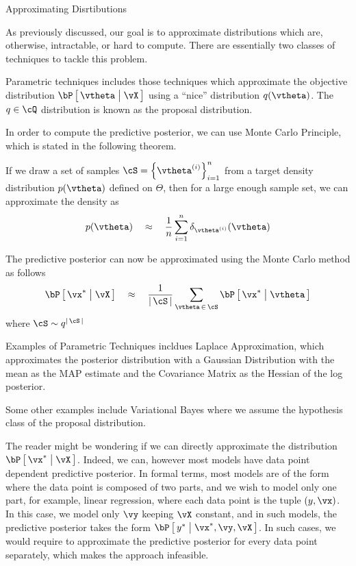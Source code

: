 \documentclass[11pt,a4paper]{article}
\begin{document}
\begin{ssection}{Approximating Disrtibutions}

	As previously discussed, our goal is to approximate distributions which are, otherwise, intractable, or hard to compute. There are essentially two classes of techniques to tackle this problem.

	\begin{enumerate}[label=\bt{\theenumi.}]

			Parametric techniques includes those techniques which approximate the objective distribution $\prob{\vtheta \pipe \vX}$ using a ``nice'' distribution $q(\vtheta)$. The $q \in \cQ$ distribution is known as the proposal distribution.

			In order to compute the predictive posterior, we can use Monte Carlo Principle, which is stated in the following theorem.
			\begin{theorem}
				If we draw a set of samples $\cS = \set{\vtheta^{(i)}}_{i = 1}^n$ from a target density distribution $p(\vtheta)$ defined on $\Theta$, then for a large enough sample set, we can approximate the density as
				\begin{align*}
					p(\vtheta) \qapprox \frac{1}{n} \sum_{i = 1}^n \delta_{\vtheta^{(i)}}(\vtheta)
				\end{align*}
			\end{theorem}

			The predictive posterior can now be approximated using the Monte Carlo method as follows
			\begin{align*}
				\prob{\vx^{\ast} \pipe \vX} \qapprox \frac{1}{\abs{\cS}} \sum_{\vtheta\,\in\,\cS} \prob{\vx^{\ast} \pipe \vtheta}
			\end{align*}
			where $\cS \sim q^{\abs{\cS}}$

			Examples of Parametric Techniques incldues Laplace Approximation, which approximates the posterior distribution with a Gaussian Distribution with the mean as the MAP estimate and the Covariance Matrix as the Hessian of the log posterior.

			Some other examples include Variational Bayes where we assume the hypothesis class of the proposal distribution.

			The reader might be wondering if we can directly approximate the distribution $\prob{\vx^{\ast} \pipe \vX}$. Indeed, we can, however most models have data point dependent predictive posterior. In formal terms, most models are of the form where the data point is composed of two parts, and we wish to model only one part, for example, linear regression, where each data point is the tuple $\para{y, \vx}$. In this case, we model only $\vy$ keeping $\vX$ constant, and in such models, the predictive posterior takes the form $\prob{y^{\ast} \pipe \vx^{\ast}, \vy, \vX}$. In such cases, we would require to approximate the predictive posterior for every data point separately, which makes the approach infeasible.


\end{enumerate}
\end{ssection}
\end{document}
